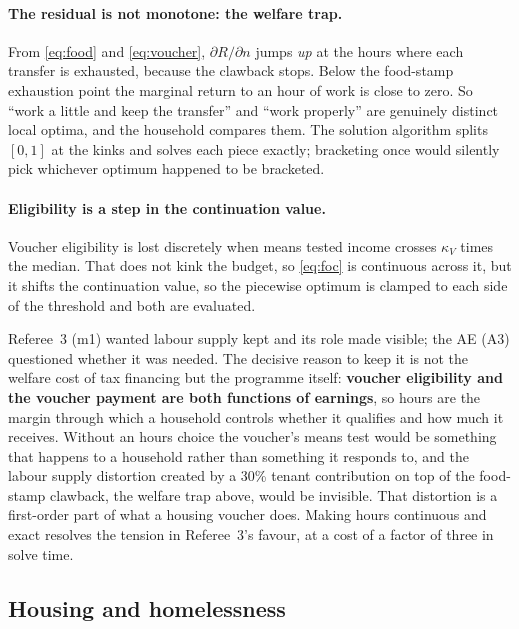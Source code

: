 \documentclass[11pt]{article}
\begin{document}
\paragraph{The residual is not monotone: the welfare trap.} From
\eqref{eq:food} and \eqref{eq:voucher}, $\partial R/\partial n$ jumps \emph{up}
at the hours where each transfer is exhausted, because the clawback stops. Below
the food-stamp exhaustion point the marginal return to an hour of work is close
to zero. So ``work a little and keep the transfer'' and ``work properly'' are
genuinely distinct local optima, and the household compares them. The solution
algorithm splits $[0,1]$ at the kinks and solves each piece exactly; bracketing
once would silently pick whichever optimum happened to be bracketed.

\paragraph{Eligibility is a step in the continuation value.} Voucher eligibility
is lost discretely when means tested income crosses $\kappa_V$ times the median.
That does not kink the budget, so \eqref{eq:foc} is continuous across it, but it shifts the continuation value, so the piecewise optimum is clamped to each
side of the threshold and both are evaluated.

Referee~3 (m1) wanted labour supply kept and its role made visible; the AE (A3)
questioned whether it was needed. The decisive reason to keep it is not the
welfare cost of tax financing but the programme itself: \textbf{voucher
eligibility and the voucher payment are both functions of earnings}, so hours
are the margin through which a household controls whether it qualifies and how
much it receives. Without an hours choice the voucher's means test would be
something that happens to a household rather than something it responds to, and
the labour supply distortion created by a 30\% tenant contribution on top of the
food-stamp clawback, the welfare trap above, would be invisible. That
distortion is a first-order part of what a housing voucher does. Making hours
continuous and exact resolves the tension in Referee~3's favour, at a cost of a
factor of three in solve time.

\subsection{Housing and homelessness}
\end{document}
